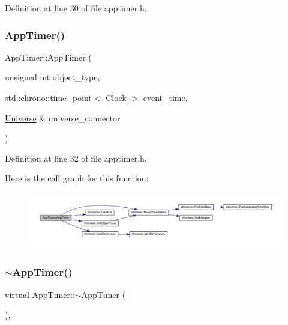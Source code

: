 Definition at line 30 of file apptimer.\+h.

\mbox{\label{class_app_timer_af0836d131aa78b6812930199a5c7f9bd}} 
\subsubsection{\texorpdfstring{App\+Timer()}{AppTimer()}\hspace{0.1cm}{\footnotesize\ttfamily [4/4]}}
{\footnotesize\ttfamily App\+Timer\+::\+App\+Timer (\begin{DoxyParamCaption}\item[{unsigned int}]{object\+\_\+type,  }\item[{std\+::chrono\+::time\+\_\+point$<$ \hyperlink{universe_8h_a0ef8d951d1ca5ab3cfaf7ab4c7a6fd80}{Clock} $>$}]{event\+\_\+time,  }\item[{\hyperlink{class_universe}{Universe} \&}]{universe\+\_\+connector }\end{DoxyParamCaption})\hspace{0.3cm}{\ttfamily [inline]}}



Definition at line 32 of file apptimer.\+h.

Here is the call graph for this function\+:
\nopagebreak
\begin{figure}[H]
\begin{center}
\leavevmode
\includegraphics[width=350pt]{class_app_timer_af0836d131aa78b6812930199a5c7f9bd_cgraph}
\end{center}
\end{figure}
\mbox{\label{class_app_timer_a5ef0c072a0591cf5a3bcc07edbd3577f}} 
\subsubsection{\texorpdfstring{$\sim$\+App\+Timer()}{~AppTimer()}}
{\footnotesize\ttfamily virtual App\+Timer\+::$\sim$\+App\+Timer (\begin{DoxyParamCaption}{ }\end{DoxyParamCaption})\hspace{0.3cm}{\ttfamily [inline]}, {\ttfamily [virtual]}}

